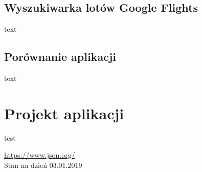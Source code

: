 \documentclass[12pt, twoside]{report}
\begin{document}
\newpage
\section{Wyszukiwarka lotów Google Flights}
text
\newpage
\section{Porównanie aplikacji}
text
\newpage

\chapter{Projekt aplikacji}
test
\newpage

\begin{thebibliography}{9}

  \url{https://www.json.org/} \\
  Stan na dzień 03.01.2019

  
\end{thebibliography}
\end{document}
